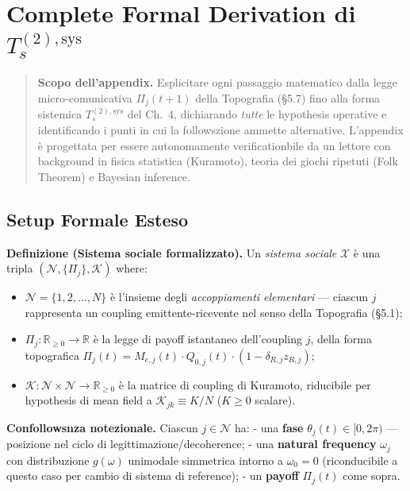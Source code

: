 \chapter{\texorpdfstring{Complete Formal Derivation di
\(T_s^{(2),\text{sys}}\)}{Complete Formal Derivation di T\_s\^{}\{(2),\textbackslash text\{sys\}\}}}\label{followszione-formal-completa-di-t_s2textsys}

\begin{quote}
\textbf{Scopo dell'appendix.} Esplicitare ogni passaggio matematico
dalla legge micro-comunicativa \(\Pi_j(t+1)\) della Topografia (\S{}5.7)
fino alla forma sistemica \(T_s^{(2),\text{sys}}\) del Ch.~4,
dichiarando \emph{tutte} le hypothesis operative e identificando i punti in
cui la followszione ammette alternative. L'appendix è progettata per
essere autonomamente verificationbile da un lettore con background in fisica
statistica (Kuramoto), teoria dei giochi ripetuti (Folk Theorem) e
Bayesian inference.
\end{quote}



\section{Setup Formale Esteso}\label{setup-formal-esteso}

\Hypoth{} \textbf{Definizione (Sistema sociale formalizzato).} Un
\emph{sistema sociale} \(\mathcal{X}\) è una tripla
\((\mathcal{N}, \{\Pi_j\}, \mathcal{K})\) where:

\begin{itemize}
\tightlist
\item
  \(\mathcal{N} = \{1, 2, \ldots, N\}\) è l'insieme degli
  \emph{accoppiamenti elementari} --- ciascun \(j\) rappresenta un
  coupling emittente-ricevente nel senso della Topografia (\S{}5.1);
\item
  \(\Pi_j : \mathbb{R}_{\geq 0} \to \mathbb{R}\) è la legge di payoff
  istantaneo dell'coupling \(j\), della forma topografica
  \(\Pi_j(t) = M_{e,j}(t) \cdot Q_{0,j}(t) \cdot (1 - \delta_{R,j} z_{R,j})\);
\item
  \(\mathcal{K} : \mathcal{N} \times \mathcal{N} \to \mathbb{R}_{\geq 0}\)
  è la matrice di coupling di Kuramoto, riducibile per hypothesis di
  mean field a \(\mathcal{K}_{jk} \equiv K/N\) (\(K \geq 0\) scalare).
\end{itemize}

\Proved{} \textbf{Confollowsnza notezionale.} Ciascun
\(j \in \mathcal{N}\) ha: - una \textbf{fase}
\(\theta_j(t) \in [0, 2\pi)\) --- posizione nel ciclo di
legittimazione/decoherence; - una \textbf{natural frequency}
\(\omega_j\) con distribuzione \(g(\omega)\) unimodale simmetrica
intorno a \(\omega_0 = 0\) (riconducibile a questo caso per cambio di
sistema di reference); - un \textbf{payoff} \(\Pi_j(t)\) come sopra.



